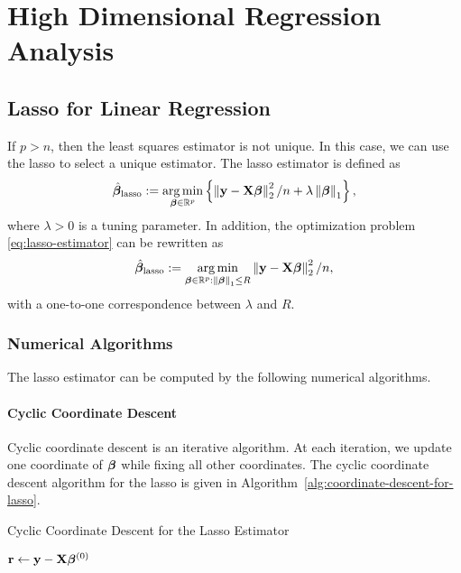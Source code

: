 \chapter{High Dimensional Regression Analysis}

\section{Lasso for Linear Regression}

If $p>n$, then the least squares estimator is not unique. In this case, we can use the lasso to select a unique estimator. The lasso estimator is defined as
\begin{equation}
	\label{eq:lasso-estimator}
	\hat{\boldsymbol{\beta}}_{\text{lasso}}:=\underset{\boldsymbol{\beta}\in{\mathbb R}^{p}}{\arg\min}\left\{\left\|{\bf y}-{\bf X}\boldsymbol{\beta}\right\|_{2}^{2}/n+\lambda\left\|\boldsymbol{\beta}\right\|_{1}\right\},
\end{equation}
where $\lambda>0$ is a tuning parameter. In addition, the optimization problem \eqref{eq:lasso-estimator} can be rewritten as
\begin{equation*}
	\hat{\boldsymbol{\beta}}_{\text{lasso}}:=\underset{\boldsymbol{\beta}\in{\mathbb R}^{p}:\left\|\boldsymbol{\beta}\right\|_{1}\leq R}{\arg\min}\left\|{\bf y}-{\bf X}\boldsymbol{\beta}\right\|_{2}^{2}/n,
\end{equation*}
with a one-to-one correspondence between $\lambda$ and $R$.

\subsection{Numerical Algorithms}

The lasso estimator can be computed by the following numerical algorithms.

\subsubsection{Cyclic Coordinate Descent}

Cyclic coordinate descent is an iterative algorithm. At each iteration, we update one coordinate of $\boldsymbol{\beta}$ while fixing all other coordinates.
The cyclic coordinate descent algorithm for the lasso is given in Algorithm~\ref{alg:coordinate-descent-for-lasso}.

\begin{algorithm}[H]
	\caption{Cyclic Coordinate Descent for the Lasso Estimator}
	\label{alg:coordinate-descent-for-lasso}
	${\bf r} \leftarrow {\bf y}-{\bf X}\boldsymbol{\beta}^{(0)}$\;
\end{algorithm}

